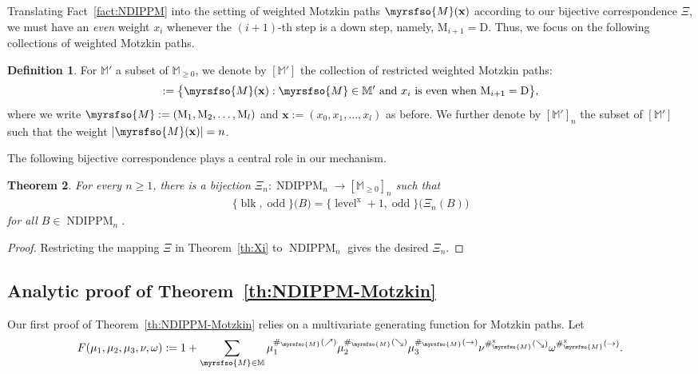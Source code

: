 \documentclass[12pt,reqno]{amsart}
\numberwithin{equation}{section}
\theoremstyle{theorem}
\newtheorem{theorem}{Theorem}[section]
\theoremstyle{definition}
\newtheorem{definition}[theorem]{Definition}
\theoremstyle{named}
\newcommand{\NDIPPM}{\operatorname{NDIPPM}}
\newcommand{\odd}{\operatorname{odd}}
\newcommand{\blk}{\operatorname{blk}}
\newcommand{\level}{\operatorname{level}}
\newcommand{\x}{\operatorname{x}}
\newcommand{\cM}{\myrsfso{M}}
\newcommand{\bbM}{\mathbb{M}}
\newcommand{\bfx}{\mathbf{x}}
\newcommand{\rmM}{\mathrm{M}}
\newcommand{\rD}{\mathrm{D}}
\begin{document}
Translating Fact~\ref{fact:NDIPPM} into the setting of weighted Motzkin paths $\cM(\bfx)$ according to our bijective correspondence $\Xi$, we must have an \emph{even} weight $x_i$ whenever the $(i+1)$-th step is a down step, namely, $\rmM_{i+1} = \rD$. Thus, we focus on the following collections of weighted Motzkin paths.

\begin{definition}\label{def:weighted-M}
	For $\bbM'$ a subset of $\bbM_{\ge 0}$, we denote by $[\bbM']$ the collection of restricted weighted Motzkin paths:
	\begin{align*}
		[\bbM'] := \big\{\cM(\bfx):\text{$\cM\in \bbM'$ and $x_i$ is even when $\rmM_{i+1} = \rD$}\big\},
	\end{align*}
	where we write $\cM := (\rmM_1,\rmM_2,\ldots,\rmM_l)$ and $\bfx := (x_0,x_1,\ldots,x_l)$ as before. We further denote by $[\bbM']_n$ the subset of $[\bbM']$ such that the weight $|\cM(\bfx)| = n$.
\end{definition}

The following bijective correspondence plays a central role in our mechanism.

\begin{theorem}\label{th:NDIPPM-core}
	For every $n\ge 1$, there is a bijection $\Xi_n : \NDIPPM_n \to [\bbM_{\ge 0}]_n$ such that
	\begin{align}
		\{\blk,\odd\}\big(B\big) = \{\level^{\x}+1,\odd\}\big(\Xi_n(B)\big)
	\end{align}
	for all $B\in \NDIPPM_n$.
\end{theorem}

\begin{proof}
	Restricting the mapping $\Xi$ in Theorem~\ref{th:Xi} to $\NDIPPM_n$ gives the desired $\Xi_n$.
\end{proof}

\subsection{Analytic proof of Theorem~\ref{th:NDIPPM-Motzkin}}\label{sec:NDIPPM-anal}

Our first proof of Theorem~\ref{th:NDIPPM-Motzkin} relies on a multivariate generating function for Motzkin paths. Let
\begin{align}\label{eq:F-gf}
	F(\mu_1,\mu_2,\mu_3,\nu,\omega) := 1 + \sum_{\cM\in \bbM} \mu_1^{\#_{\cM}(\nearrow)} \mu_2^{\#_{\cM}(\searrow)} \mu_3^{\#_{\cM}(\rightarrow)} \nu^{\#_{\cM}^{\x}(\searrow)} \omega^{\#_{\cM}^{\x}(\rightarrow)}.
\end{align}
\end{document}
